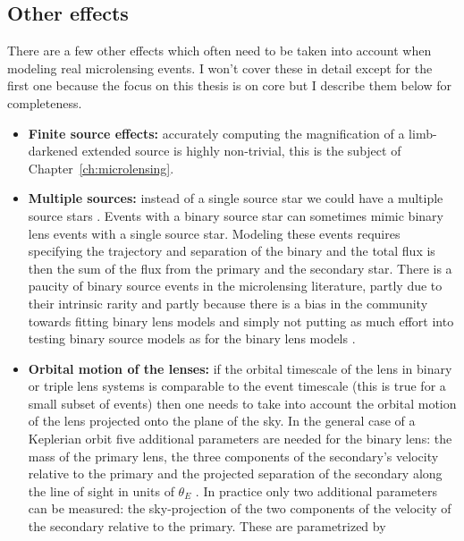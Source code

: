 \documentclass[12pt]{report}
\begin{document}
\subsection{Other effects}
There are a few other effects which often need to be taken into account when
modeling real microlensing events. I won't cover these in detail except for the
first one because the focus on this thesis is on core but I describe them below
for completeness.
\begin{itemize}
    \item \textbf{Finite source effects:} accurately computing the magnification
          of a limb-darkened extended source is highly non-trivial, this is the subject
          of Chapter~\ref{ch:microlensing}.
    \item \textbf{Multiple sources:} instead of a single source star we could have
          a multiple source stars \citep{1998A&A...333..893D}.  Events with a binary source
          star can sometimes mimic binary lens events with a single source star.
          Modeling these events requires specifying the trajectory and separation of
          the binary and the total flux is then the sum of the flux from the primary and the
          secondary star.
          There is a paucity of binary source events in the microlensing literature, partly due to
          their intrinsic rarity \citep{1998MNRAS.301..231H} and partly because there is a
          bias in the community towards fitting binary lens models and
          simply not putting as much effort into testing binary source models as
          for the binary lens models \citep{2017AJ....153..129J,2019MNRAS.484.5608D}.
    \item \textbf{Orbital motion of the lenses:} if the orbital timescale of
          the lens in binary or triple lens systems is comparable to the event timescale
          (this is true for a small subset of events) then one needs to take into account
          the orbital motion of the lens projected onto the plane of the sky.
          In the general case of a Keplerian orbit five additional parameters are needed
          for the binary lens: the mass of the primary lens, the three components of the
          secondary's velocity relative to the primary and the projected separation
          of the secondary along the line of sight in units of $\theta_E$
          \citep{1998A&A...329..361D}. In practice only two additional parameters
          can be measured: the sky-projection of the two components of the velocity of
          the secondary relative to the primary. These are parametrized by

\end{itemize}
\end{document}
